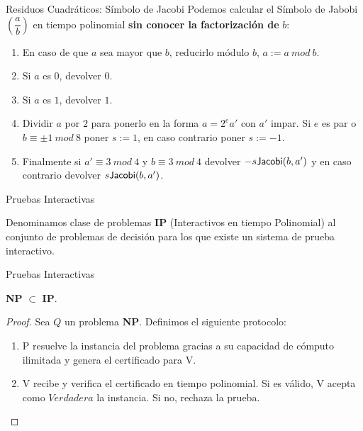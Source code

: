 \documentclass{beamer}
\begin{document}
\begin{frame}{Residuos Cuadráticos: Símbolo de Jacobi}
Podemos calcular el Símbolo de Jabobi $\left( \dfrac{a}{b} \right)$ en tiempo polinomial \textbf{sin conocer la factorización de} $b$: 
\begin{enumerate}
\item En caso de que $a$ sea mayor que $b$, reducirlo m\'odulo $b$, $a := a ~ mod ~b$.
\item Si $a$ es $0$, devolver $0$.
\item Si $a$ es $1$, devolver $1$.
\item Dividir $a$ por $2$ para ponerlo en la forma $a = 2^e a'$ con $a'$ impar. Si $e$ es par o $b \equiv \pm 1 ~mod~8$ poner $s := 1$, en caso contrario poner $s := -1$.
\item Finalmente si $a' \equiv 3 ~mod~4$ y $b \equiv 3~mod~4$ devolver $-s {\sf Jacobi}(b,a')$ y en caso contrario devolver $s {\sf Jacobi}(b,a')$.
\end{enumerate}
\end{frame}



\begin{frame}{Pruebas Interactivas}
\begin{definition}
	Denominamos clase de problemas \textbf{IP} (Interactivos en tiempo Polinomial) al conjunto de problemas de decisión para los que existe un sistema de prueba interactivo.
\end{definition}
\end{frame}



\begin{frame}{Pruebas Interactivas}
\begin{theorem}
\textbf{NP} $\subset$ \textbf{IP}.
\end{theorem}

\begin{proof}
Sea $Q$ un problema \textbf{NP}. Definimos el siguiente protocolo:
\begin{enumerate}
	\item  P resuelve la instancia del problema gracias a su capacidad de cómputo ilimitada y genera el certificado para V.
	\item  V recibe y verifica el certificado en tiempo polinomial. Si es válido, V acepta como $Verdadera$ la instancia. Si no, rechaza la prueba.
\end{enumerate}
\end{proof}
\end{frame}
\end{document}
